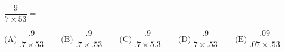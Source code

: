 $\dfrac{9}{7\times 53} =$



$\text{(A)}\ \dfrac{.9}{.7\times 53} \qquad \text{(B)}\ \dfrac{.9}{.7\times .53} \qquad \text{(C)}\ \dfrac{.9}{.7\times 5.3} \qquad \text{(D)}\ \dfrac{.9}{7\times .53} \qquad \text{(E)}\ \dfrac{.09}{.07\times .53}$
